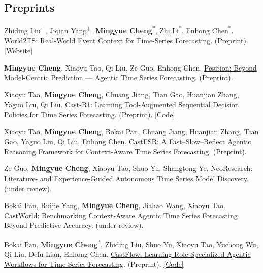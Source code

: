 \documentclass[UTF8,fontset=fandol,scheme=plain,11pt,a4paper]{ctexart}
\newcommand{\pubentry}[1]{\item \begin{minipage}[t]{\linewidth}#1\end{minipage}}
\begin{document}
\subsection{Preprints}
\begin{publist}[start=69]
\pubentry{Zhiding Liu\textsuperscript{+}, Jiqian Yang\textsuperscript{+}, \textbf{Mingyue Cheng}\textsuperscript{*}, Zhi Li\textsuperscript{*}, Enhong Chen\textsuperscript{*}. \href{https://arxiv.org/abs/2610.14861}{World2TS: Real-World Event Context for Time-Series Forecasting}. (Preprint). \href{https://world2ts.github.io/}{[Website]}}

\pubentry{\textbf{Mingyue Cheng}, Xiaoyu Tao, Qi Liu, Ze Guo, Enhong Chen. \href{https://arxiv.org/pdf/2602.01776.pdf}{Position: Beyond Model-Centric Prediction --- Agentic Time Series Forecasting}. (Preprint).}

\pubentry{Xiaoyu Tao, \textbf{Mingyue Cheng}, Chuang Jiang, Tian Gao, Huanjian Zhang, Yaguo Liu, Qi Liu. \href{https://arxiv.org/pdf/2602.13802}{Cast-R1: Learning Tool-Augmented Sequential Decision Policies for Time Series Forecasting}. (Preprint). \href{https://github.com/Xiaoyu-Tao/Cast-R1-TS}{[Code]}}

\pubentry{Xiaoyu Tao, \textbf{Mingyue Cheng}, Bokai Pan, Chuang Jiang, Huanjian Zhang, Tian Gao, Yaguo Liu, Qi Liu, Enhong Chen. \href{https://arxiv.org/abs/2608.03031}{CastFSR: A Fast--Slow--Reflect Agentic Reasoning Framework for Context-Aware Time Series Forecasting}. (Preprint).}

\pubentry{Ze Guo, \textbf{Mingyue Cheng}, Xiaoyu Tao, Shuo Yu, Shangtong Ye. NeoResearch: Literature- and Experience-Guided Autonomous Time Series Model Discovery. (under review).}

\pubentry{Bokai Pan, Ruijie Yang, \textbf{Mingyue Cheng}, Jiahao Wang, Xiaoyu Tao. CastWorld: Benchmarking Context-Aware Agentic Time Series Forecasting Beyond Predictive Accuracy. (under review).}

\pubentry{Bokai Pan, \textbf{Mingyue Cheng}\textsuperscript{*}, Zhiding Liu, Shuo Yu, Xiaoyu Tao, Yuchong Wu, Qi Liu, Defu Lian, Enhong Chen. \href{https://arxiv.org/pdf/2604.27840}{CastFlow: Learning Role-Specialized Agentic Workflows for Time Series Forecasting}. (Preprint). \href{https://github.com/Forever-Pan/CastFlow}{[Code]}}


\end{publist}
\end{document}
